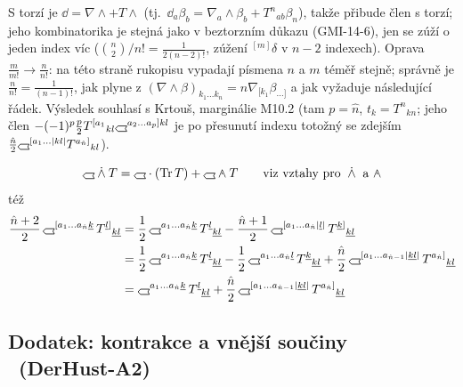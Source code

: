 \begin{vysvetleni}
S torzí je $\dd = \nabla\wedge + T\wedge$ (tj.\ $\dd_a\beta_b = \nabla_a\wedge\beta_b + T^n{}_{ab}\beta_n$), takže přibude člen s torzí;
jeho kombinatorika je stejná jako v beztorzním důkazu (GMI-14-6), jen se zúží o jeden index víc
($\binom n2/n! = \frac{1}{2(n-2)!}$, zúžení ${}^{[m]}\delta$ v $n-2$ indexech). Oprava $\frac{m}{m!}\to\frac{n}{n!}$: na této straně rukopisu
vypadají písmena $n$ a $m$ téměř stejně; správně je $\frac{n}{n!} = \frac{1}{(n-1)!}$, jak plyne z $(\nabla\wedge\beta)_{k_1\dots k_n} = n\nabla_{[k_1}\beta_{\dots]}$
a jak vyžaduje následující řádek. Výsledek souhlasí s Krtouš, marginálie M10.2 (tam $p=\hat n$, $t_k = T^n{}_{kn}$; jeho člen
$-(-1)^p\frac p2T^{[a_1}{}_{kl}\gmIhustsym^{a_2\dots a_p]kl}$ je po přesunutí indexu totožný se zdejším $\frac{\hat n}{2}\gmIhustsym^{[a_1\dots|kl|}T^{a_{\hat n}]}{}_{kl}$).
\end{vysvetleni}

\[
  \gmIhustsym\gmIdotwedge T = \gmIhustsym\cdot(\mathrm{Tr}\,T) + \gmIhustsym\gmIwedgedot T \qquad\text{viz vztahy pro } \gmIdotwedge \text{ a } \gmIwedgedot
\]
též
\begin{align*}
  \frac{\hat n+2}{2}\,\gmIhustsym^{[a_1\dots a_{\hat n}\underline k}\,T^{\underline l]}{}_{\underline{kl}}
  &= \frac12\,\gmIhustsym^{a_1\dots a_{\hat n}\underline k}\,T^{\underline l}{}_{\underline{kl}}
   - \frac{\hat n+1}{2}\,\gmIhustsym^{[a_1\dots a_{\hat n}|\underline l|}\,T^{\underline k]}{}_{\underline{kl}} \\
  &= \frac12\,\gmIhustsym^{a_1\dots a_{\hat n}\underline k}\,T^{\underline l}{}_{\underline{kl}}
   - \frac12\,\gmIhustsym^{a_1\dots a_{\hat n}\underline l}\,T^{\underline k}{}_{\underline{kl}}
   + \frac{\hat n}{2}\,\gmIhustsym^{[a_1\dots a_{\hat n-1}|\underline{kl}|}\,T^{a_{\hat n}]}{}_{\underline{kl}} \\
  &= \gmIhustsym^{a_1\dots a_{\hat n}\underline k}\,T^{\underline l}{}_{\underline{kl}}
   + \frac{\hat n}{2}\,\gmIhustsym^{[a_1\dots a_{\hat n-1}|\underline{kl}|}\,T^{a_{\hat n}]}{}_{\underline{kl}}
\end{align*}

\subsection*{Dodatek: kontrakce a vnější součiny \ \normalfont\small(DerHust-A2)}

